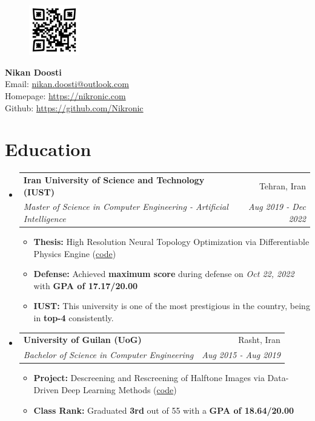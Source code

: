 \documentclass[letterpaper,11pt]{article}
\makeatletter
\newcommand{\resumeItem}[1]{
  \item\small{
    {#1 \vspace{0pt}}
  }
}
\newcommand{\resumeSubheadingF}[4]{
  \item
    \begin{tabular*}{0.97\textwidth}{l@{\extracolsep{\fill}}r}
      \textbf{#1} & #2 \\ 
      \textit{\small#3} & \textit{\small #4} \\
    \end{tabular*}\vspace{-5pt}
}
\newcommand{\resumeSubHeadingListStart}{\begin{itemize}[leftmargin=*]}
\newcommand{\resumeSubHeadingListEnd}{\end{itemize}}
\newcommand{\resumeItemListStart}{\begin{itemize}}
\newcommand{\resumeItemListEnd}{\end{itemize}\vspace{-5pt}}
\makeatother
\begin{document}
\begin{figure} %
  \vspace{-\baselineskip} %
  \includegraphics[width=2.2cm, height=2.2cm]{qrcode.png}
\end{figure}

\textbf{{\Large Nikan Doosti}} \\
Email: \href{mailto:nikan.doosti@outlook.com}{nikan.doosti@outlook.com}\\
Homepage: \href{https://nikronic.com/}{https://nikronic.com}\\
Github: \href{https://github.com/Nikronic}{https://github.com/Nikronic}

\hspace{0cm} %
\section{Education}
 \resumeSubHeadingListStart
   \resumeSubheadingF
     {Iran University of Science and Technology (IUST)}{Tehran, Iran}
     {Master of Science in Computer Engineering - Artificial Intelligence}{Aug 2019 - Dec 2022}
      \resumeItemListStart
        \resumeItem{\textbf{Thesis:} High Resolution Neural Topology Optimization via Differentiable Physics Engine (\href{https://github.com/Nikronic/ndr}{code})}
        \resumeItem{\textbf{Defense:} Achieved \textbf{maximum score} during defense on \textit{Oct 22, 2022} with \textbf{GPA of 17.17/20.00}}
        \resumeItem{\textbf{IUST:} This university is one of the most prestigious in the country, being in \textbf{top-4} consistently.}
      \resumeItemListEnd
   \resumeSubheadingF
     {University of Guilan (UoG)}{Rasht, Iran}
     {Bachelor of Science in Computer Engineering}{Aug 2015 - Aug 2019}
     \resumeItemListStart
        \resumeItem{\textbf{Project:} Descreening and Rescreening of Halftone Images via Data-Driven Deep Learning Methods (\href{https://github.com/Nikronic/Deep-Halftoning}{code})}
        \resumeItem{\textbf{Class Rank:} Graduated \textbf{3rd} out of 55 with a \textbf{GPA of 18.64/20.00}}
      \resumeItemListEnd
 \resumeSubHeadingListEnd
\end{document}
